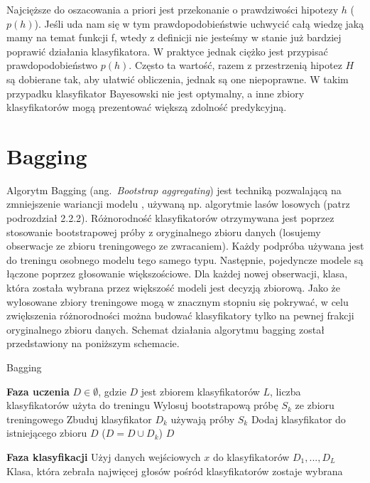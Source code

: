 \documentclass[12pt,a4paper,twoside,openany]{book}
\begin{document}
Najcięższe do oszacowania a priori jest przekonanie o prawdziwości hipotezy $h$ ($p(h)$). Jeśli uda nam się w tym prawdopodobieństwie uchwycić całą wiedzę jaką mamy na temat funkcji f, wtedy z definicji nie jesteśmy w stanie już bardziej poprawić działania klasyfikatora. W praktyce jednak ciężko jest przypisać prawdopodobieństwo $p(h)$. Często ta wartość, razem z przestrzenią hipotez $H$ są dobierane tak, aby ułatwić obliczenia, jednak są one niepoprawne. W takim przypadku klasyfikator Bayesowski nie jest optymalny, a inne zbiory klasyfikatorów mogą prezentować większą zdolność predykcyjną.


\section{Bagging}

Algorytm Bagging (ang.~\textit{Bootstrap aggregating}) jest techniką pozwalającą na zmniejszenie wariancji modelu \citep{breiman1996}, używaną np. algorytmie lasów losowych (patrz podrozdział 2.2.2). Różnorodność klasyfikatorów otrzymywana jest poprzez stosowanie bootstrapowej próby z oryginalnego zbioru danych (losujemy obserwacje ze zbioru treningowego ze zwracaniem). Każdy podpróba używana jest do treningu osobnego modelu tego samego typu. Następnie, pojedyncze modele są łączone poprzez głosowanie większościowe. Dla każdej nowej obserwacji, klasa, która została wybrana przez większość modeli jest decyzją zbiorową. Jako że wylosowane zbiory treningowe mogą w znacznym stopniu się pokrywać, w celu zwiększenia różnorodności można budować klasyfikatory tylko na pewnej frakcji oryginalnego zbioru danych. Schemat działania algorytmu bagging został przedstawiony na poniższym schemacie.

\begin{algorithm}
\renewcommand\thealgorithm{}
\caption{Bagging}
\begin{algorithmic} \label{schemat2}
\STATE \textbf{Faza uczenia}
\STATE  $D \in \emptyset$, gdzie $D$ jest zbiorem klasyfikatorów
\STATE $L$, liczba klasyfikatorów użyta do treningu
\STATE Wylosuj bootstrapową próbę $S_k$ ze zbioru treningowego
\STATE Zbuduj klasyfikator $D_k$ używają próby $S_k$
\STATE Dodaj klasyfikator do istniejącego zbioru $D$ ($D = D \cup D_k$)
\ENDFOR  
\RETURN $D$

\STATE \textbf{Faza klasyfikacji}
\STATE Użyj danych wejściowych $x$ do klasyfikatorów $D_1, ..., D_L$
\STATE Klasa, która zebrała najwięcej głosów pośród klasyfikatorów zostaje wybrana
\end{algorithmic}
\addtocounter{algorithm}{-1}
\end{algorithm}
\end{document}
